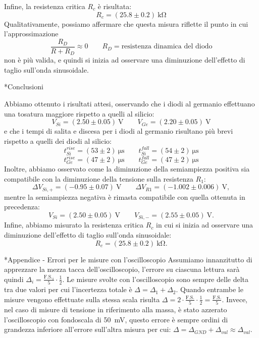 \documentclass[12pt,italian]{article}
\makeatletter
\numberwithin{table}{section}
\let\oldsection\section
\renewcommand{\section}{\@ifstar{\@mystarsection}{\@mynormsection}}
\newcommand{\@mystarsection}[1]{%
    \oldsection*{#1}%
    \phantomsection%
    \addcontentsline{toc}{section}{#1}%
}
\newcommand{\@mynormsection}[2][]{%
    \if\relax\detokenize{#1}\relax
        \oldsection{#2}%
    \else
        \oldsection[#1]{#2}%
    \fi
}
\makeatother
\begin{document}
Infine, la resistenza critica $R_c$ è risultata:
\[
	R_c = (25.8 \pm 0.2) \ \unit{\kilo\ohm}
\]
Qualitativamente, possiamo affermare che questa misura riflette il punto in cui
l'approssimazione
\[
	\frac{R_D}{R + R_D	} \approx 0 \qquad R_D = \text{resistenza dinamica del diodo}
\]
non è più valida, e quindi si inizia ad osservare una diminuzione dell'effetto
di taglio sull'onda sinusoidale.

\section*{Conclusioni}

Abbiamo ottenuto i risultati attesi, osservando che i diodi al germanio
effettuano una tosatura maggiore rispetto a quelli al silicio:
\[
	V_{Si} = (2.50 \pm 0.05) \ \unit{\volt} \qquad
	V_{Ge} = (2.20 \pm 0.05) \ \unit{\volt}
\]
e che i tempi di salita e discesa per i diodi al germanio risultano più brevi
rispetto a quelli dei diodi al silicio:
\[
	t^{rise}_{Si} = (53 \pm 2) \ \unit{\micro\second} \qquad
	t^{fall}_{Si} = (54 \pm 2) \ \unit{\micro\second}
\]
\[
	t^{rise}_{Ge} = (47 \pm 2) \ \unit{\micro\second} \qquad
	t^{fall}_{Ge} = (47 \pm 2) \ \unit{\micro\second}
\]
Inoltre, abbiamo osservato come la diminuzione della semiampiezza positiva sia
compatibile con la diminuzione della tensione sulla resistenza $R_1$:
\[
	\Delta V_{Si, +} = (-0.95 \pm 0.07) \ \unit{\volt} \qquad
	\Delta V_{R1} = (-1.002 \pm 0.006) \ \unit{\volt},
\]
mentre la semiampiezza negativa è rimasta compatibile con quella ottenuta in
precedenza:
\[
	V_{Si} = (2.50 \pm 0.05) \ \unit{\volt} \qquad
	V_{Si, -} = (2.55 \pm 0.05) \ \unit{\volt}.
\]
Infine, abbiamo misurato la resistenza critica $R_c$ in cui si inizia ad
osservare una diminuzione dell'effetto di taglio sull'onda sinusoidale:
\[
	R_c = (25.8 \pm 0.2) \ \unit{\kilo\ohm}.
\]

\appendix
\section*{Appendice - Errori per le misure con l'oscilloscopio}
Assumiamo innanzitutto di apprezzare la mezza tacca dell'oscilloscopio,
l'errore su ciascuna lettura sarà quindi $\Delta_i =
	\frac{{\text{F.S.}}_i}{5} \cdot \frac{1}{2}$. Le misure svolte con l'oscilloscopio sono sempre
delle delta tra due valori per cui l'incertezza totale è $\Delta = \Delta_1 +
	\Delta_2$. Quando entrambe le misure vengono effettuate sulla stessa scala
risulta $\Delta = 2 \cdot \frac{\text{F.S.}}{5} \cdot \frac{1}{2} = \frac{\text{F.S.}}{5}$. Invece, nel
caso di misure di tensione in riferimento alla massa, è stato azzerato
l'oscilloscopio con fondoscala di \qty{50}{\milli\volt}, questo errore è sempre
ordini di grandezza inferiore all'errore sull'altra misura per cui: $\Delta =
	\Delta_{GND} + \Delta_{val} \approx \Delta_{val}$.
\end{document}
